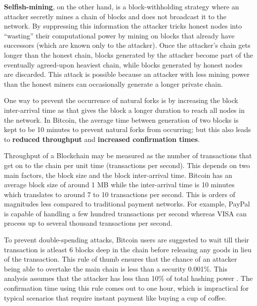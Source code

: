 \textbf{Selfish-mining}, on the other hand, is a block-withholding strategy where an attacker secretly mines a chain of blocks and does not broadcast it to the network. By suppressing this information the attacker tricks honest nodes into “wasting” their computational power by mining on blocks that already have successors (which are known only to the attacker). 
Once the attacker's chain gets longer than the honest chain, blocks generated by the attacker become part of the eventually agreed-upon heaviest chain, while blocks generated by honest nodes are discarded.
This attack is possible because an attacker with less mining power than the honest miners can occasionally generate a longer private chain.

One way to prevent the occurrence of natural forks is by increasing the block inter-arrival time as that gives the block a longer duration to reach all nodes in the network. 
In Bitcoin, the average time between generation of two blocks is kept to be 10 minutes to prevent natural forks from occurring;
but this also leads to \textbf{reduced throughput} and \textbf{increased confirmation times}.

Throughput of a Blockchain may be measured as the number of transactions that get on to the chain per unit time (transactions per second). 
This depends on two main factors, the block size and the block inter-arrival time. 
Bitcoin has an average block size of around 1 MB while the inter-arrival time is 10 minutes which translates to around 7 to 10 transactions per second.
This is orders of magnitudes less compared to traditional payment networks. 
For example, PayPal is capable of handling a few hundred transactions per second 
whereas VISA can process up to several thousand transactions per second. \cite{scalingBlockchains, visanet}

To prevent double-spending attacks, Bitcoin users are suggested to wait till their transaction is atleast 6 blocks deep in the chain before releasing any goods in lieu of the transaction.
This rule of thumb ensures that the chance of an attacker being able to overtake the main chain is less than a security 0.001\%. This analysis assumes that the attacker has less than 10\% of total hashing power \cite{bitcoinOriginal, Rosenfeld}.
The confirmation time using this rule comes out to one hour, which is impractical for typical scenarios that require instant payment like buying a cup of coffee.

